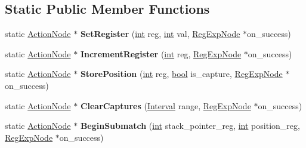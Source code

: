 \subsection*{Static Public Member Functions}
\begin{DoxyCompactItemize}
\item 
\mbox{\label{classv8_1_1internal_1_1ActionNode_ab0232aafb29641c830970993c18ca5a7}} 
static \mbox{\hyperlink{classv8_1_1internal_1_1ActionNode}{Action\+Node}} $\ast$ {\bfseries Set\+Register} (\mbox{\hyperlink{classint}{int}} reg, \mbox{\hyperlink{classint}{int}} val, \mbox{\hyperlink{classv8_1_1internal_1_1RegExpNode}{Reg\+Exp\+Node}} $\ast$on\+\_\+success)
\item 
\mbox{\label{classv8_1_1internal_1_1ActionNode_ac2fea920241e4412a3bba2d10acb91ef}} 
static \mbox{\hyperlink{classv8_1_1internal_1_1ActionNode}{Action\+Node}} $\ast$ {\bfseries Increment\+Register} (\mbox{\hyperlink{classint}{int}} reg, \mbox{\hyperlink{classv8_1_1internal_1_1RegExpNode}{Reg\+Exp\+Node}} $\ast$on\+\_\+success)
\item 
\mbox{\label{classv8_1_1internal_1_1ActionNode_a7b7c1ea99df9360c97a7e73e2672a834}} 
static \mbox{\hyperlink{classv8_1_1internal_1_1ActionNode}{Action\+Node}} $\ast$ {\bfseries Store\+Position} (\mbox{\hyperlink{classint}{int}} reg, \mbox{\hyperlink{classbool}{bool}} is\+\_\+capture, \mbox{\hyperlink{classv8_1_1internal_1_1RegExpNode}{Reg\+Exp\+Node}} $\ast$on\+\_\+success)
\item 
\mbox{\label{classv8_1_1internal_1_1ActionNode_af5c152a32e7afbe31390f57c07eed05a}} 
static \mbox{\hyperlink{classv8_1_1internal_1_1ActionNode}{Action\+Node}} $\ast$ {\bfseries Clear\+Captures} (\mbox{\hyperlink{classv8_1_1internal_1_1Interval}{Interval}} range, \mbox{\hyperlink{classv8_1_1internal_1_1RegExpNode}{Reg\+Exp\+Node}} $\ast$on\+\_\+success)
\item 
\mbox{\label{classv8_1_1internal_1_1ActionNode_a84297f33bee6dffd0cc7a6b5341fb106}} 
static \mbox{\hyperlink{classv8_1_1internal_1_1ActionNode}{Action\+Node}} $\ast$ {\bfseries Begin\+Submatch} (\mbox{\hyperlink{classint}{int}} stack\+\_\+pointer\+\_\+reg, \mbox{\hyperlink{classint}{int}} position\+\_\+reg, \mbox{\hyperlink{classv8_1_1internal_1_1RegExpNode}{Reg\+Exp\+Node}} $\ast$on\+\_\+success)

\end{DoxyCompactItemize}
